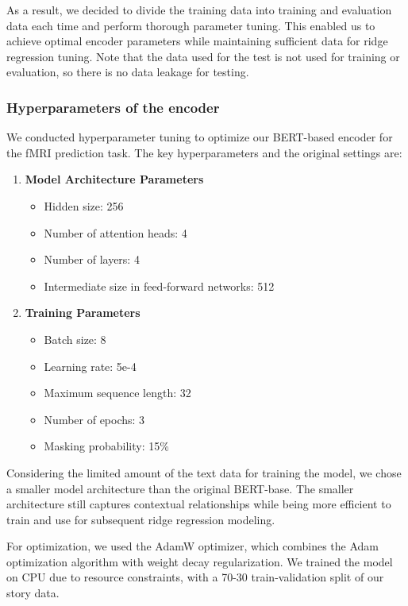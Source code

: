 \documentclass[12pt,letterpaper]{article}
\begin{document}
As a result, we decided to divide the training data into training and evaluation data each time and perform thorough parameter tuning. This enabled us to achieve optimal encoder parameters while maintaining sufficient data for ridge regression tuning. Note that the data used for the test is not used for training or evaluation, so there is no data leakage for testing.

\subsubsection{Hyperparameters of the encoder}
We conducted hyperparameter tuning to optimize our BERT-based encoder for the fMRI prediction task. The key hyperparameters and the original settings are:

\begin{enumerate}
    \item \textbf{Model Architecture Parameters}
    \begin{itemize}
        \item Hidden size: 256 
        \item Number of attention heads: 4 
        \item Number of layers: 4 
        \item Intermediate size in feed-forward networks: 512 
    \end{itemize}
    
    \item \textbf{Training Parameters}
    \begin{itemize}
        \item Batch size: 8
        \item Learning rate: 5e-4
        \item Maximum sequence length: 32
        \item Number of epochs: 3
        \item Masking probability: 15\%
    \end{itemize}
\end{enumerate}

Considering the limited amount of the text data for training the model, we chose a smaller model architecture than the original BERT-base. The smaller architecture still captures contextual relationships while being more efficient to train and use for subsequent ridge regression modeling.

For optimization, we used the AdamW optimizer, which combines the Adam optimization algorithm with weight decay regularization. We trained the model on CPU due to resource constraints, with a 70-30 train-validation split of our story data. 
\end{document}
